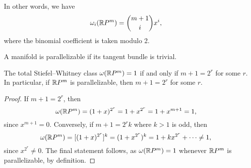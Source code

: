 \documentclass[ma3408.tex]{subfiles}
\begin{document}
\begin{Rem}
In other words, we have
\[
\omega_i(\mathbb{R} P^m) = \binom{m+1}{i}x^i,
\]
where the binomial coefficient is taken modulo 2. 
\end{Rem}
\begin{Def}
A manifold is parallelizable if its tangent bundle is trivial. 
\end{Def}
\begin{Cor}
The total Stiefel--Whitney class $\omega(\mathbb{R} P^m) =1$ if and only if $m + 1 = 2^r$ for some $r$. In particular, if $\mathbb{R} P^m$ is parallelizable, then $m+1 = 2^r$ for some $r$.
\end{Cor}
\begin{proof}
If $m + 1 = 2^r$, then 
\[
\omega(\mathbb{R} P^m) = (1+x)^{2^r} = 1+x^{2^r} = 1+x^{m+1} = 1,
\]
since $x^{m+1} = 0$. Conversely, if $m+1=2^rk$ where $k>1$ is odd, then 
\[
\omega(\mathbb{R} P^m) = [(1+x)^{2^r}]^k = (1+x^{2^r})^k = 1+kx^{2^r} + \cdots \ne 1,
\]
since $x^{2^r} \ne 0$. The final statement follows, as $\omega(\mathbb{R} P^m) = 1$ whenever $\mathbb{R} P^m$ is parallelizable, by definition. 
\end{proof}
\end{document}
